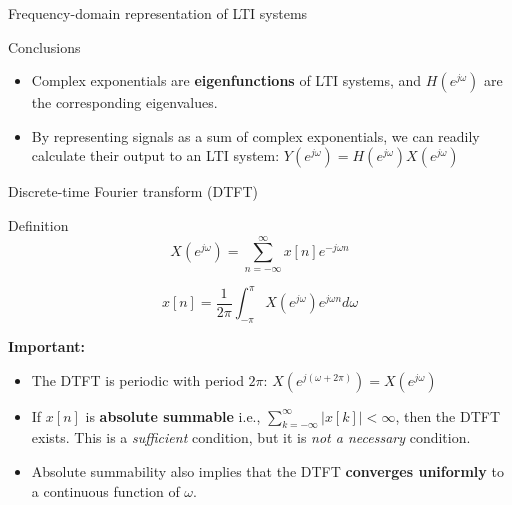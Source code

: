 \documentclass[10pt, aspectratio=169]{beamer}
\begin{document}
\begin{frame}{Frequency-domain representation of LTI systems}
\pause
\begin{block}{Conclusions}
	\begin{itemize}
		\item Complex exponentials are \textbf{eigenfunctions} of LTI systems, and $H(e^{j\omega})$ are the corresponding eigenvalues.
		\item By representing signals as a sum of complex exponentials, we can readily calculate their output to an LTI system: $Y(e^{j\omega}) = H(e^{j\omega})X(e^{j\omega})$
	\end{itemize} 
\end{block}
\end{frame}

%
\begin{frame}{Discrete-time Fourier transform (DTFT)}

\begin{block}{Definition}
\begin{equation} \tag{Direct transform}
X(e^{j\omega}) = \sum_{n=-\infty}^{\infty} x[n]e^{-j\omega n} 
\end{equation}

\begin{equation}\tag{Inverse transform}
x[n] = \frac{1}{2\pi}\int_{-\pi}^{\pi}X(e^{j\omega})e^{j\omega n}d\omega
\end{equation}
\end{block}

\textbf{Important:}
\begin{itemize}
	\item The DTFT is periodic with period $2\pi$: $\displaystyle X(e^{j(\omega + 2\pi)}) = X(e^{j\omega})$
	\item If $x[n]$ is \textbf{absolute summable} i.e., $\sum_{k=-\infty}^{\infty} |x[k]| < \infty$, then the DTFT exists. This is a \textit{sufficient} condition, but it is \textit{not a necessary} condition.
	\item Absolute summability also implies that the DTFT \textbf{converges uniformly} to a continuous function of $\omega$.
\end{itemize}
\end{frame}
\end{document}
